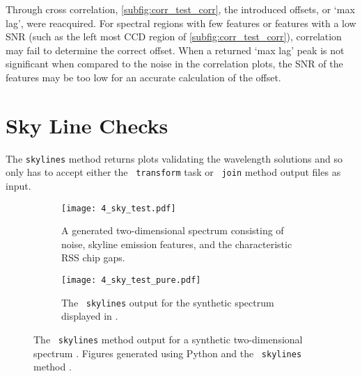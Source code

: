 Through cross correlation, \autoref{subfig:corr_test_corr}, the introduced offsets, or `max lag', were reacquired.
For spectral regions with few features or features with a low \gls{SNR} (such as the left most \gls{CCD} region of \autoref{subfig:corr_test_corr}), correlation may fail to determine the correct offset.
When a returned `max lag' peak is not significant when compared to the noise in the correlation plots, the \gls{SNR} of the features may be too low for an accurate calculation of the offset.

\section{Sky Line Checks} \label{subsec:test_sky}

The \texttt{skylines} method returns plots validating the wavelength solutions and so only has to accept either the \iraf\ \texttt{transform} task or \stops\ \texttt{join} method output files as input.

\begin{figure}[t]
    \centering
    \begin{subfigure}[b]{1.0 \textwidth}
        \centering
        \texttt{[image: 4\_sky\_test.pdf]}
        \caption{A generated two-dimensional spectrum consisting of noise, skyline emission features, and the characteristic \gls{RSS} chip gaps.}
        \label{subfig:sky_test_spec}
    \end{subfigure}
    \hfill
    \begin{subfigure}[b]{1.0 \textwidth}
        \centering
        \texttt{[image: 4\_sky\_test\_pure.pdf]}
        \caption{The \stops\ \texttt{skylines} output for the synthetic spectrum displayed in .}
        \label{subfig:sky_test_pure}
    \end{subfigure}
    \caption{The \stops\ \texttt{skylines} method output  for a synthetic two-dimensional spectrum . Figures generated using Python  and the \stops\ \texttt{skylines} method .}
    \label{fig:sky_test}
\end{figure}

